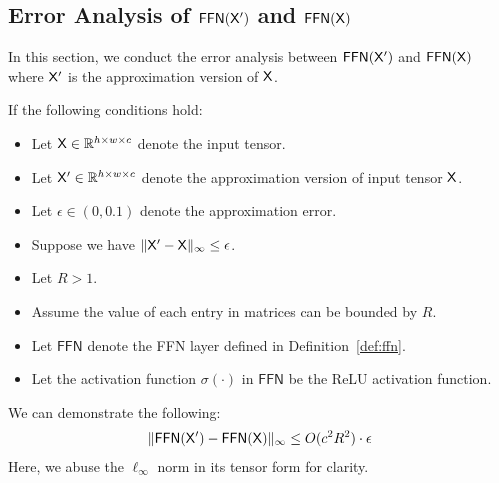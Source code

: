 \subsection{Error Analysis of \texorpdfstring{$\mathsf{FFN}(\mathsf{X}')$}{} and \texorpdfstring{$\mathsf{FFN}(\mathsf{X})$}{}}\label{sec:error_analysis_of_ffn_x_prime_ffn_x}
In this section, we conduct the error analysis between $\mathsf{FFN}(\mathsf{X}')$ and $\mathsf{FFN}(\mathsf{X})$ where $\mathsf{X}'$ is the approximation version of $\mathsf{X}$.
\begin{lemma}\label{lem:error_analysis_ffn}
    If the following conditions hold:
    \begin{itemize}
        \item Let $\mathsf{X} \in \mathbb{R}^{h \times w \times c}$ denote the input tensor.
        \item Let $\mathsf{X}' \in \mathbb{R}^{h \times w \times c}$ denote the approximation version of input tensor $\mathsf{X}$.
        \item Let $\epsilon \in (0, 0.1)$ denote the approximation error. 
        \item Suppose we have $\| \mathsf{X}' - \mathsf{X} \|_\infty \leq \epsilon$.
        \item Let $R > 1$.
        \item Assume the value of each entry in matrices can be bounded by $R$. 
        \item Let $\mathsf{FFN}$ denote the FFN layer defined in Definition~\ref{def:ffn}.
        \item Let the activation function $\sigma(\cdot)$ in $\mathsf{FFN}$ be the ReLU activation function.
    \end{itemize}
    We can demonstrate the following:
    \begin{align*}
        \| \mathsf{FFN}(\mathsf{X}') - \mathsf{FFN}(\mathsf{X}) \|_\infty \leq O(c^2 R^2) \cdot \epsilon
    \end{align*}
    Here, we abuse the $\ell_\infty$ norm in its tensor form for clarity.
\end{lemma}
